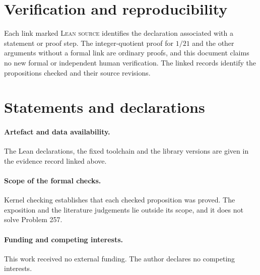 \documentclass[11pt]{article}
\theoremstyle{plain}
\theoremstyle{definition}
\theoremstyle{remark}
\begin{document}
\endgroup

\section*{Verification and reproducibility}
\evidenceparagraph{\evidencerecordurl}
Each link marked \textsc{Lean source} identifies the declaration associated
with a statement or proof step. The integer-quotient proof for $1/21$
and the other arguments without a formal link are ordinary proofs, and this
document claims no new formal or independent human verification. The
linked records identify the propositions checked and their source revisions.

\section*{Statements and declarations}

\paragraph{Artefact and data availability.} The Lean declarations, the fixed
toolchain and the library versions are given in the evidence record linked above.

\paragraph{Scope of the formal checks.} Kernel checking establishes that each checked
proposition was proved. The exposition and the literature judgements lie outside
its scope, and it does not solve Problem 257.

\paragraph{Funding and competing interests.} This work received no external
funding. The author declares no competing interests.
\end{document}
